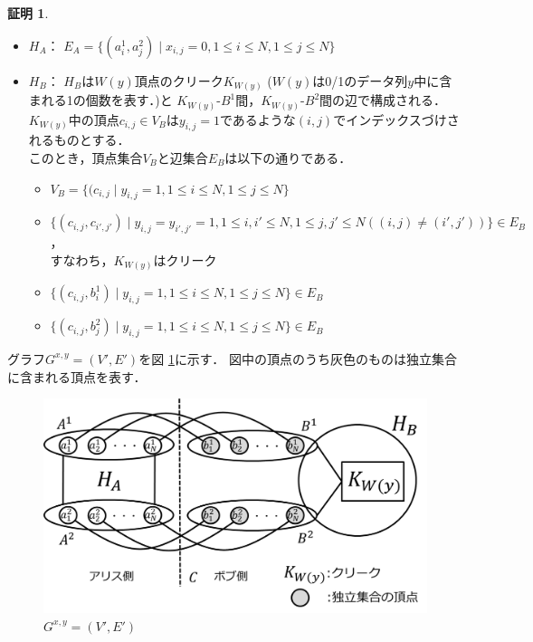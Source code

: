 \documentclass[12pt]{thesis}
\theoremstyle{definition}
\newtheorem*{prf*}{証明}
\begin{document}
\begin{prf*}
\begin{itemize}
\item $H_{A}$： $E_{A}=\{(a^{1}_{i},a^{2}_{j}) \mid x_{i,j}=0, 1 \leq i \leq N, 1 \leq j \leq N\}$
\item $H_{B}$： $H_{B}$は$W(y)$頂点のクリーク$K_{W(y)}$
($W(y)$は0/1のデータ列$y$中に含まれる1の個数を表す．)と
$K_{W(y)}$-$B^{1}$間，$K_{W(y)}$-$B^{2}$間の辺で構成される．
$K_{W(y)}$中の頂点$c_{i, j} \in V_{B}$は$y_{i, j} = 1$であるような$(i, j)$でインデックスづけされるものとする． \\
このとき，頂点集合$V_{B}$と辺集合$E_{B}$は以下の通りである．
\begin{itemize}
\item $V_{B}=\{(c_{i,j} \mid y_{i,j}=1, 1 \leq i \leq N, 1 \leq j \leq N\}$
\item $\{(c_{i,j}, c_{i',j'}) \mid y_{i,j}=y_{i',j'}=1, 1 \leq i,i' \leq N,1 \leq j,j' \leq N((i,j) \neq (i',j'))\} \in E_{B}$，\\
すなわち，$K_{W(y)}$はクリーク
\item $\{(c_{i,j},b^{1}_{i}) \mid y_{i,j}=1, 1 \leq i \leq N, 1 \leq j \leq N\} \in E_{B}$
\item $\{(c_{i,j},b^{2}_{j}) \mid y_{i,j}=1, 1 \leq i \leq N, 1 \leq j \leq N\} \in E_{B}$
\end{itemize}
\end{itemize}
グラフ$G^{x, y} = (V', E')$を図 \ref{2_G(x,y)}に示す．
図中の頂点のうち灰色のものは独立集合に含まれる頂点を表す．

\begin{figure}[ht]
\begin{center}
\includegraphics[width=120mm]{2_Gxy.png}
\end{center}
\caption{$G^{x, y} = (V', E')$}
\label{2_G(x,y)}
\end{figure}


\end{prf*}
\end{document}
